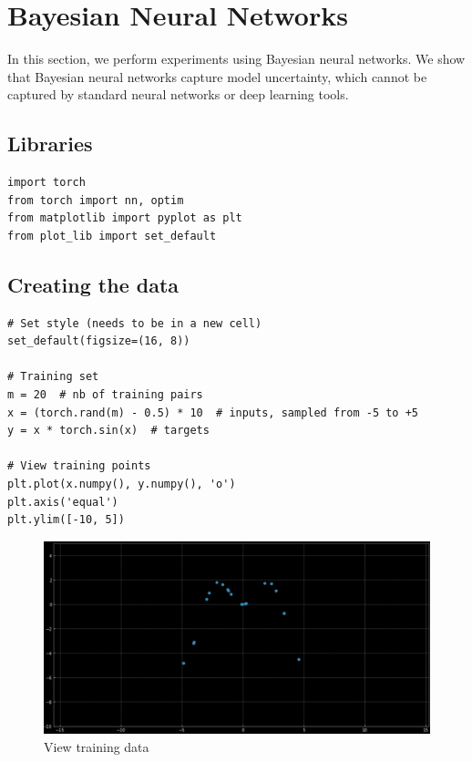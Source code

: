 \chapter{Bayesian Neural Networks}

In this section, we perform experiments using Bayesian neural networks. We show that Bayesian neural networks capture model uncertainty, which cannot be captured by standard neural networks or deep learning tools. 

\section{Libraries}

\begin{verbatim}
import torch
from torch import nn, optim
from matplotlib import pyplot as plt
from plot_lib import set_default
\end{verbatim}

\section{Creating the data}
\begin{verbatim}
# Set style (needs to be in a new cell)
set_default(figsize=(16, 8))

# Training set
m = 20  # nb of training pairs
x = (torch.rand(m) - 0.5) * 10  # inputs, sampled from -5 to +5
y = x * torch.sin(x)  # targets

# View training points
plt.plot(x.numpy(), y.numpy(), 'o')
plt.axis('equal')
plt.ylim([-10, 5])
\end{verbatim}

\begin{figure}[H]
    \centering
    \includegraphics[width=\textwidth]{figs/exp_1.png}
    \caption{View training data}
    \label{fig:training_data}
\end{figure}


